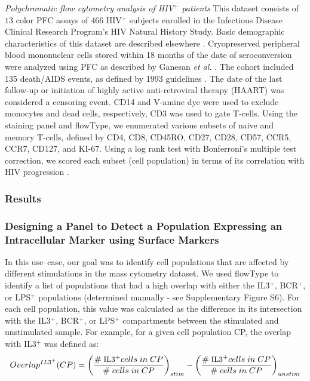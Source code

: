 \emph{Polychromatic flow cytometry analysis of HIV$^+$ patients}
This dataset consists of $13$ color PFC assays of $466$ HIV$^+$ subjects enrolled in the Infectious Disease Clinical Research Program's HIV Natural History Study.
Basic demographic characteristics of this dataset are described elsewhere \cite{weintrob2008increasing}.
Cryopreserved peripheral blood mononuclear cells stored within 18 months of the date of seroconversion were analyzed using PFC as described by Ganesan \emph{et al.} \cite{Ganesan2010Immunologic}. 
The cohort included 135 death/AIDS events, as defined by 1993 guidelines \cite{castro1992revised}.
The date of the last follow-up or initiation of highly active anti-retroviral therapy (HAART) was considered a censoring event.
CD14 and V-amine dye were used to exclude monocytes and dead cells, respectively, CD3 was used to gate T-cells.
Using the staining panel and flowType, we enumerated various subsets of naive and memory T-cells, defined by CD4, CD8, CD45RO, CD27, CD28, CD57, CCR5, CCR7, CD127, and KI-67.
Using a log rank test with Bonferroni's multiple test correction, we scored each subset (cell population) in terms of its correlation with HIV progression \cite{Aghaeepour2012}.

\subsubsection*{Results}


\subsubsection{Designing a Panel to Detect a Population Expressing an Intracellular Marker using Surface Markers}
In this use--case, our goal was to identify cell populations that are affected by different stimulations in the mass cytometry dataset.
We used flowType to identify a list of populations that had a high overlap with either the IL3$^+$, BCR$^+$, or LPS$^+$ populations (determined manually - see Supplementary Figure S6).
For each cell population, this value was calculated as the difference in its intersection with the IL3$^+$, BCR$^+$, or LPS$^+$ compartments between the stimulated and unstimulated sample.
For example, for a given cell population CP, the overlap with IL3$^+$ was defined as:
\begin{equation}\small
  Overlap^{IL3^+}(CP)=\left(\frac{\# \; \mbox{IL3}^+cells \; in \; CP}{\# \; cells \; in \; CP}\right)_{stim}-  \left(\frac{\# \; \mbox{IL3}^+cells \; in \; CP}{\# \; cells \; in \; CP}\right)_{unstim}
\end{equation}

